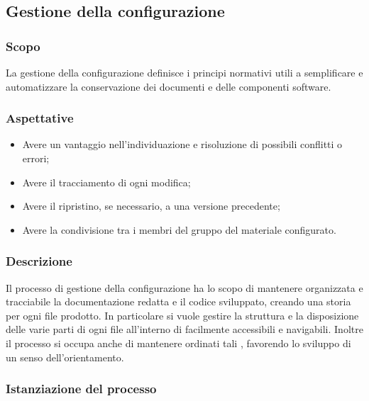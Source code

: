 \subsection{Gestione della configurazione}
\subsubsection{Scopo}

La gestione della configurazione definisce i principi normativi utili a semplificare e automatizzare la conservazione dei documenti e delle componenti software.

\subsubsection{Aspettative}
\begin{itemize}
	\item Avere un vantaggio nell'individuazione e risoluzione di possibili conflitti o errori;
	\item Avere il tracciamento di ogni modifica;
	\item Avere il ripristino, se necessario, a una versione precedente;
	\item Avere la condivisione tra i membri del gruppo del materiale configurato.
\end{itemize}

\subsubsection{Descrizione}
Il processo di gestione della configurazione ha lo scopo di mantenere organizzata e tracciabile la documentazione redatta e il codice sviluppato, creando una storia per ogni file prodotto. In particolare si vuole gestire la struttura e la disposizione delle varie parti di ogni file all'interno di  facilmente accessibili e navigabili.
Inoltre il processo si occupa anche di mantenere ordinati tali , favorendo lo sviluppo di un senso dell'orientamento.


\subsubsection{Istanziazione del processo}
